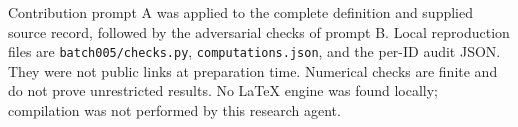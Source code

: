 \documentclass[11pt]{article}
\begin{document}
Contribution prompt A was applied to the complete definition and supplied source record, followed by the adversarial checks of prompt B. Local reproduction files are \texttt{batch005/checks.py}, \texttt{computations.json}, and the per-ID audit JSON. They were not public links at preparation time. Numerical checks are finite and do not prove unrestricted results. No LaTeX engine was found locally; compilation was not performed by this research agent.
\end{document}
